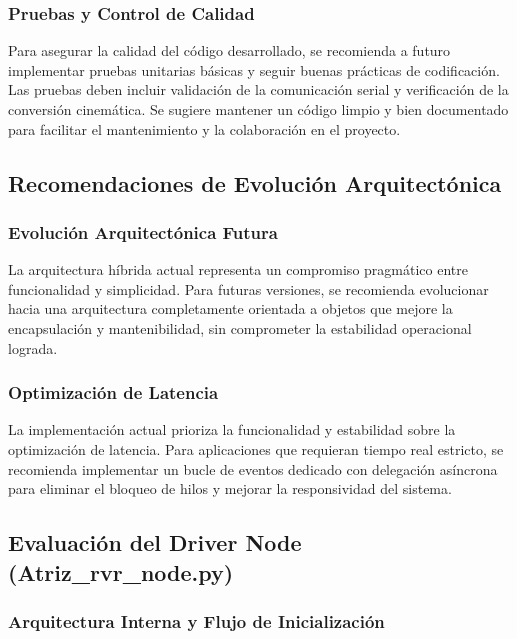 \documentclass[11pt]{article}
\numberwithin{figure}{section}
\numberwithin{table}{section}
\begin{document}
\subsubsection{Pruebas y Control de Calidad}

Para asegurar la calidad del código desarrollado, se recomienda a futuro implementar pruebas unitarias básicas y seguir buenas prácticas de codificación. Las pruebas deben incluir validación de la comunicación serial y verificación de la conversión cinemática. Se sugiere mantener un código limpio y bien documentado para facilitar el mantenimiento y la colaboración en el proyecto.


\subsection{Recomendaciones de Evolución Arquitectónica}


\subsubsection{Evolución Arquitectónica Futura}

La arquitectura híbrida actual representa un compromiso pragmático entre funcionalidad y simplicidad. Para futuras versiones, se recomienda evolucionar hacia una arquitectura completamente orientada a objetos que mejore la encapsulación y mantenibilidad, sin comprometer la estabilidad operacional lograda.


\subsubsection{Optimización de Latencia}

La implementación actual prioriza la funcionalidad y estabilidad sobre la optimización de latencia. Para aplicaciones que requieran tiempo real estricto, se recomienda implementar un bucle de eventos dedicado con delegación asíncrona para eliminar el bloqueo de hilos y mejorar la responsividad del sistema.


\subsection{Evaluación del Driver Node (Atriz\_rvr\_node.py)}
\label{sec:logros_tecnicos}


\subsubsection{Arquitectura Interna y Flujo de Inicialización}
\end{document}
